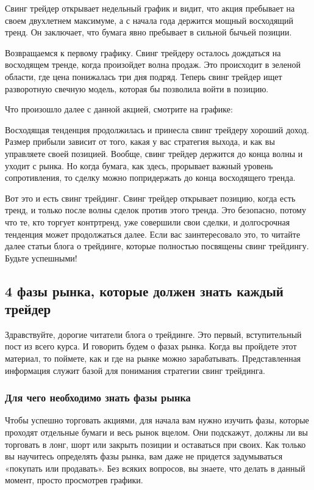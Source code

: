 \documentclass{book}
\begin{document}

Свинг трейдер открывает недельный график и видит, что акция пребывает на своем двухлетнем максимуме, а с начала года держится мощный восходящий тренд. Он заключает, что бумага явно пребывает в сильной бычьей позиции.

Возвращаемся к первому графику. Свинг трейдеру осталось дождаться на восходящем тренде, когда произойдет волна продаж. Это происходит в зеленой области, где цена понижалась три дня подряд. Теперь свинг трейдер ищет разворотную свечную модель, которая бы позволила войти в позицию.

Что произошло далее с данной акцией, смотрите на графике:


Восходящая тенденция продолжилась и принесла свинг трейдеру хороший доход. Размер прибыли зависит от того, какая у вас стратегия выхода, и как вы управляете своей позицией. Вообще, свинг трейдер держится до конца волны и уходит с рынка. Но когда бумага, как здесь, прорывает важный уровень сопротивления, то сделку можно попридержать до конца восходящего тренда.

Вот это и есть свинг трейдинг. Свинг трейдер открывает позицию, когда есть тренд, и только после волны сделок против этого тренда. Это безопасно, потому что те, кто торгует контртренд, уже совершили свои сделки, и долгосрочная тенденция может продолжаться далее. Если вас заинтересовало это, то читайте далее статьи блога о трейдинге, которые полностью посвящены свинг трейдингу. Будьте успешными!

\subsection{4 фазы рынка, которые должен знать каждый трейдер}

Здравствуйте, дорогие читатели блога о трейдинге. Это первый, вступительный пост из всего курса. И говорить будем о фазах рынка. Когда вы пройдете этот материал, то поймете, как и где на рынке можно зарабатывать. Представленная информация служит базой для понимания стратегии свинг трейдинга.

\subsubsection{Для чего необходимо знать фазы рынка}

Чтобы успешно торговать акциями, для начала вам нужно изучить фазы, которые проходят отдельные бумаги и весь рынок вцелом. Они подскажут, должны ли вы торговать в лонг, шорт или закрыть позиции и оставаться при своих. Как только вы научитесь определять фазы рынка, вам даже не придется задумываться «покупать или продавать». Без всяких вопросов, вы знаете, что делать в данный момент, просто просмотрев графики.
\end{document}
